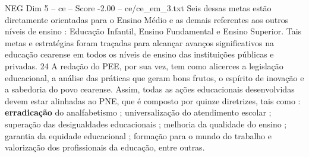 \begin{textsample}{NEG Dim 5 – ce – Score -2.00 – ce/ce\_em\_3.txt}
Seis dessas metas estão diretamente orientadas para o Ensino Médio e as demais referentes aos outros níveis de ensino : Educação Infantil, Ensino Fundamental e Ensino Superior.
Tais metas e estratégias foram traçadas para alcançar avanços significativos na educação cearense em todos os níveis de ensino das instituições públicas e privadas. 24 A redação do PEE, por sua vez, tem como alicerces a legislação educacional, a análise das práticas que geram bons frutos, o espírito de inovação e a sabedoria do povo cearense.
Assim, todas as ações educacionais desenvolvidas devem estar alinhadas ao PNE, que é composto por quinze diretrizes, tais como : \textbf{erradicação} do analfabetismo ; universalização do atendimento escolar ; superação das desigualdades educacionais ; melhoria da qualidade do ensino ; garantia da equidade educacional ; formação para o mundo do trabalho e valorização dos profissionais da educação, entre outras.

\end{textsample}
